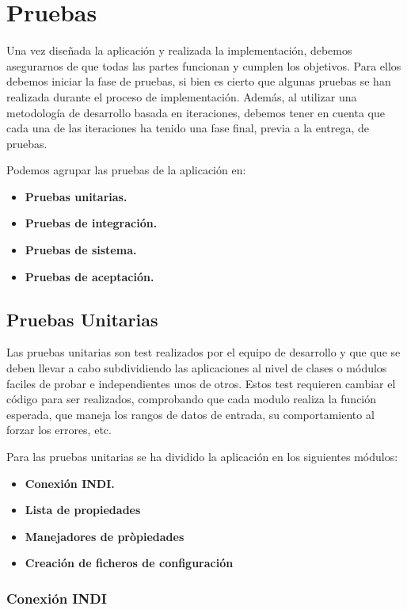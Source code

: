 \chapter{Pruebas}

Una vez diseñada la aplicación y realizada la implementación, debemos asegurarnos de que todas las partes funcionan y cumplen los objetivos. Para ellos debemos iniciar la fase de pruebas, si bien es cierto que algunas pruebas se han realizada durante el proceso de implementación. Además, al utilizar una metodología de desarrollo basada en iteraciones, debemos tener en cuenta que cada una de las iteraciones ha tenido una fase final, previa a la entrega, de pruebas.

\bigskip
Podemos agrupar las pruebas de la aplicación en:

\begin{itemize}
  \item \textbf{Pruebas unitarias.}
  \item \textbf{Pruebas de integración.}
  \item \textbf{Pruebas de sistema.}
  \item \textbf{Pruebas de aceptación.}
\end{itemize}


\bigskip
\section{Pruebas Unitarias}

Las pruebas unitarias son test realizados por el equipo de desarrollo y que que se deben llevar a cabo subdividiendo las aplicaciones al nivel de clases o módulos faciles de probar e independientes unos de otros. Estos test requieren cambiar el código para ser realizados, comprobando que cada modulo realiza la función esperada, que maneja los rangos de datos de entrada, su comportamiento al forzar los errores, etc.

Para las pruebas unitarias se ha dividido la aplicación en los siguientes módulos:

\begin{itemize}
  \item \textbf{Conexión INDI.}
  \item \textbf{Lista de propiedades}
  \item \textbf{Manejadores de pròpiedades}
  \item \textbf{Creación de ficheros de configuración}
\end{itemize}


\subsection{Conexión INDI}

